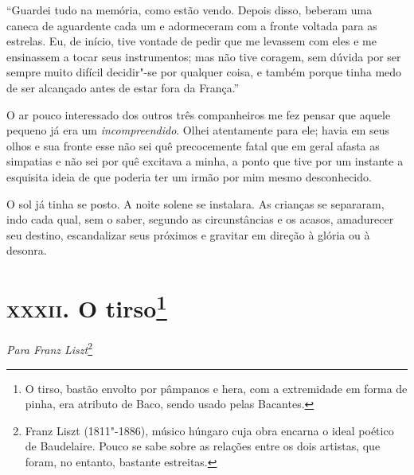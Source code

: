 “Guardei tudo na memória, como estão vendo. Depois disso, 
beberam uma caneca de aguardente cada um e adormeceram com a fronte
voltada para as estrelas. Eu, de início, tive vontade de
pedir que me levassem com eles e me ensinassem a tocar seus
instrumentos; mas não tive coragem, sem dúvida por ser sempre muito
difícil decidir"-se por qualquer coisa, e também porque tinha medo
de ser alcançado antes de estar fora da França.''

O ar pouco interessado dos outros três companheiros me fez pensar
que aquele pequeno já era um \textit{incompreendido}. Olhei atentamente para ele;
havia em seus olhos e sua fronte esse não sei quê precocemente fatal
que em geral afasta as simpatias e não sei por quê excitava a
minha, a ponto que tive por um instante a esquisita ideia de que 
poderia ter um irmão por mim mesmo desconhecido.

O sol já tinha se posto. A noite solene se instalara. As crianças se
separaram, indo cada qual, sem o saber, segundo as circunstâncias e
os acasos, amadurecer seu destino, escandalizar seus próximos e
gravitar em direção à glória ou à desonra.

\chapter{\textsc{xxxii.} O tirso\footnote[*]{O tirso, bastão envolto por pâmpanos e hera, com a extremidade em forma de pinha, era atributo de Baco, sendo usado pelas Bacantes.}}

\begin{flushright}
\textit{Para Franz Liszt}\footnote{ Franz Liszt (1811"-1886), músico húngaro cuja obra encarna o ideal
poético de Baudelaire. Pouco se sabe sobre as relações entre os dois
artistas, que foram, no entanto, bastante estreitas.}
\end{flushright}\medskip

